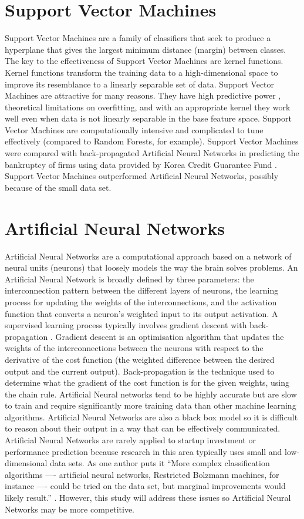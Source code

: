 \section{Support Vector Machines}

Support Vector Machines are a family of classifiers that seek to produce a hyperplane that gives the largest minimum distance (margin) between classes. The key to the effectiveness of Support Vector Machines are kernel functions. Kernel functions transform the training data to a high-dimensional space to improve its resemblance to a linearly separable set of data. Support Vector Machines are attractive for many reasons. They have high predictive power \cite{caruana2006}, theoretical limitations on overfitting, and with an appropriate kernel they work well even when data is not linearly separable in the base feature space. Support Vector Machines are computationally intensive and complicated to tune effectively (compared to Random Forests, for example). Support Vector Machines were compared with back-propagated Artificial Neural Networks in predicting the bankruptcy of firms using data provided by Korea Credit Guarantee Fund \cite{shin2005}. Support Vector Machines outperformed Artificial Neural Networks, possibly because of the small data set.

\section{Artificial Neural Networks}

Artificial Neural Networks are a computational approach based on a network of neural units (neurons) that loosely models the way the brain solves problems. An Artificial Neural Network is broadly defined by three parameters: the interconnection pattern between the different layers of neurons, the learning process for updating the weights of the interconnections, and the activation function that converts a neuron's weighted input to its output activation. A supervised learning process typically involves gradient descent with back-propagation \cite{friedman2001}. Gradient descent is an optimisation algorithm that updates the weights of the interconnections between the neurons with respect to the derivative of the cost function (the weighted difference between the desired output and the current output). Back-propagation is the technique used to determine what the gradient of the cost function is for the given weights, using the chain rule. Artificial Neural networks tend to be highly accurate but are slow to train and require significantly more training data than other machine learning algorithms. Artificial Neural Networks are also a black box model so it is difficult to reason about their output in a way that can be effectively communicated. Artificial Neural Networks are rarely applied to startup investment or performance prediction because research in this area typically uses small and low-dimensional data sets. As one author puts it ``More complex classification algorithms —- artificial neural networks, Restricted Bolzmann machines, for instance —- could be tried on the data set, but marginal improvements would likely result.'' \cite{beckwith2016}. However, this study will address these issues so Artificial Neural Networks may be more competitive.
